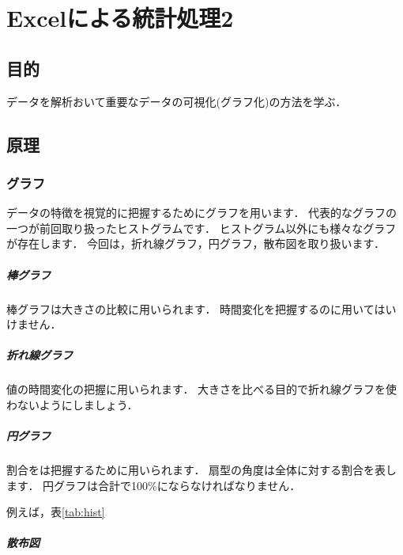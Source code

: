 

\chapter{Excelによる統計処理2}

\section{目的}

データを解析おいて重要なデータの可視化(グラフ化)の方法を学ぶ．

\section{原理}

\subsection{グラフ}

データの特徴を視覚的に把握するためにグラフを用います．
代表的なグラフの一つが前回取り扱ったヒストグラムです．
ヒストグラム以外にも様々なグラフが存在します．
今回は，折れ線グラフ，円グラフ，散布図を取り扱います．

\paragraph{棒グラフ}

棒グラフは大きさの比較に用いられます．
時間変化を把握するのに用いてはいけません．

\paragraph{折れ線グラフ}

値の時間変化の把握に用いられます．
大きさを比べる目的で折れ線グラフを使わないようにしましょう．

\paragraph{円グラフ}

割合をは把握するために用いられます．
扇型の角度は全体に対する割合を表します．
円グラフは合計で100\%にならなければなりません．

例えば，表\ref{tab:hist}

\paragraph{散布図}

